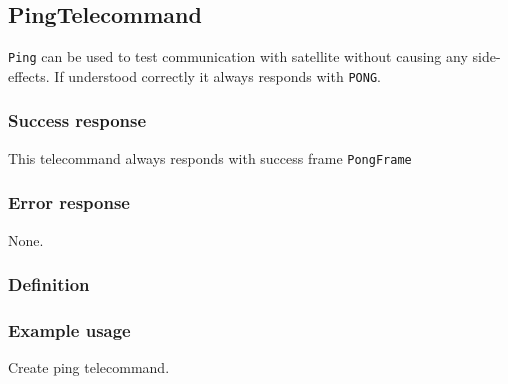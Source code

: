 \subsection{PingTelecommand}
\texttt{Ping} can be used to test communication with satellite without causing any side-effects. If understood correctly it always responds with \texttt{PONG}.

\subsubsection{Success response}
This telecommand always responds with success frame \texttt{PongFrame}

\subsubsection{Error response}
None.

\subsubsection{Definition}


\subsubsection{Example usage}
Create ping telecommand.

